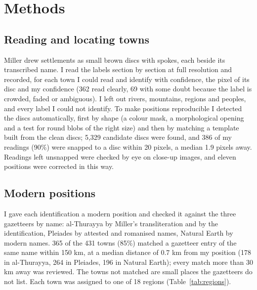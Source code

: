 \documentclass[11pt,a4paper]{article}
\begin{document}
\section{Methods}
\subsection{Reading and locating towns}
Miller drew settlements as small brown discs with spokes, each beside its transcribed name. I read the labels section by section at full resolution and recorded, for each town I could read and identify with confidence, the pixel of its disc and my confidence (362 read clearly, 69 with some doubt because the label is crowded, faded or ambiguous). I left out rivers, mountains, regions and peoples, and every label I could not identify. To make positions reproducible I detected the discs automatically, first by shape (a colour mask, a morphological opening and a test for round blobs of the right size) and then by matching a template built from the clean discs; 5,329 candidate discs were found, and 386 of my readings (90\%) were snapped to a disc within 20 pixels, a median 1.9 pixels away. Readings left unsnapped were checked by eye on close-up images, and eleven positions were corrected in this way.

\subsection{Modern positions}
I gave each identification a modern position and checked it against the three gazetteers by name: al-Thurayya by Miller's transliteration and by the identification, Pleiades by attested and romanised names, Natural Earth by modern names. 365 of the 431 towns (85\%) matched a gazetteer entry of the same name within 150 km, at a median distance of 0.7 km from my position (178 in al-Thurayya, 264 in Pleiades, 196 in Natural Earth); every match more than 30 km away was reviewed. The towns not matched are small places the gazetteers do not list. Each town was assigned to one of 18 regions (Table~\ref{tab:regions}).
\end{document}

